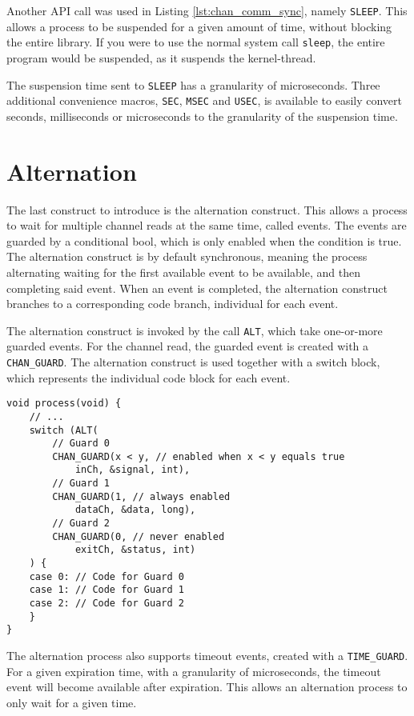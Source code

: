 Another API call was used in Listing \ref{lst:chan_comm_sync}, namely \texttt{SLEEP}. This allows a process to be suspended for a given amount of time, without blocking the entire library. If you were to use the normal system call \texttt{sleep}, the entire program would be suspended, as it suspends the kernel\hyp{}thread. 

The suspension time sent to \texttt{SLEEP} has a granularity of microseconds. Three additional convenience macros, \texttt{SEC}, \texttt{MSEC} and \texttt{USEC}, is available to easily convert seconds, milliseconds or microseconds to the granularity of the suspension time. 

\section*{Alternation}

The last construct to introduce is the alternation construct. This allows a process to wait for multiple channel reads at the same time, called events. The events are guarded by a conditional bool, which is only enabled when the condition is true. The alternation construct is by default synchronous, meaning the process alternating waiting for the first available event to be available, and then completing said event. When an event is completed, the alternation construct branches to a corresponding code branch, individual for each event.

The alternation construct is invoked by the call \texttt{ALT}, which take one\hyp{}or\hyp{}more guarded events. For the channel read, the guarded event is created with a \texttt{CHAN\_GUARD}. The alternation construct is used together with a switch block, which represents the individual code block for each event.

\begin{lstlisting}[style={CustomC},caption={Alternation construct setup with channel read guards}]
void process(void) {
    // ...
    switch (ALT(
        // Guard 0
        CHAN_GUARD(x < y, // enabled when x < y equals true
            inCh, &signal, int),
        // Guard 1
        CHAN_GUARD(1, // always enabled
            dataCh, &data, long),
        // Guard 2
        CHAN_GUARD(0, // never enabled
            exitCh, &status, int)
    ) {
    case 0: // Code for Guard 0 
    case 1: // Code for Guard 1 
    case 2: // Code for Guard 2 
    }
}
\end{lstlisting}

The alternation process also supports timeout events, created with a \texttt{TIME\_GUARD}. For a given expiration time, with a granularity of microseconds, the timeout event will become available after expiration. This allows an alternation process to only wait for a given time. 

